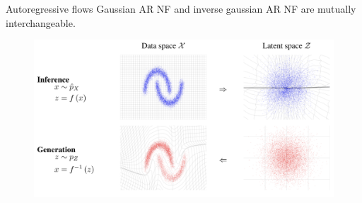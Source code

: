 \begin{frame}{Autoregressive flows}
	Gaussian AR NF and inverse gaussian AR NF are mutually interchangeable. 
	\begin{figure}
		\includegraphics[width=\linewidth]{figs/flows_how2.png}
	\end{figure}
	
\end{frame}
